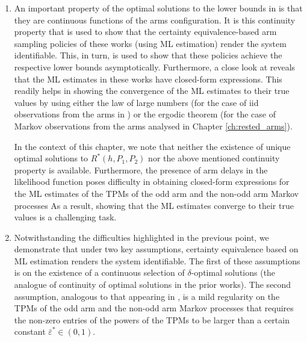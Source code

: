 \begin{enumerate}
	\item An important property of the optimal solutions to the lower bounds in \cite{vaidhiyan2017learning, prabhu2017optimal} is that they are continuous functions of the arms configuration. It is this continuity property that is used to show that the certainty equivalence-based arm sampling policies of these works (using ML estimation) render the system identifiable. This, in turn, is used to show that these policies achieve the respective lower bounds asymptotically. Furthermore, a close look at \cite{vaidhiyan2017learning, prabhu2017optimal} reveals that the ML estimates in these works have closed-form expressions. This readily helps in showing the convergence of the ML estimates to their true values by using either the law of large numbers (for the case of iid observations from the arms in \cite{vaidhiyan2017learning, prabhu2017optimal}) or the ergodic theorem (for the case of Markov observations from the arms analysed in Chapter \ref{ch:rested_arms}).
	
	In the context of this chapter, we note that neither the existence of unique optimal solutions to $R^*(h, P_1, P_2)$ nor the above mentioned continuity property is available. Furthermore, the presence of arm delays in the likelihood function poses difficulty in obtaining closed-form expressions for the ML estimates of the TPMs of the odd arm and the non-odd arm Markov processes As a result, showing that the ML estimates converge to their true values is a challenging task.
	
	\item Notwithstanding the difficulties highlighted in the previous point, we demonstrate that under two key assumptions, certainty equivalence based on ML estimation renders the system identifiable. The first of these assumptions is on the existence of a continuous selection of $\delta$-optimal solutions (the analogue of continuity of optimal solutions in the prior works). The second assumption, analogous to that appearing in \cite{borkar1979adaptive}, is a mild regularity on the TPMs of the odd arm and the non-odd arm Markov processes that requires the non-zero entries of the powers of the TPMs to be larger than a certain constant $\bar{\varepsilon}^*\in (0,1)$. 
	

\end{enumerate}
